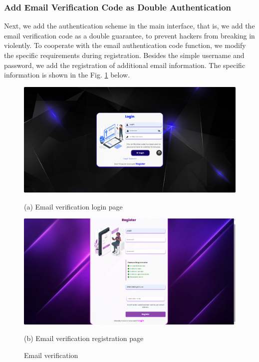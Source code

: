 \documentclass{article}
\begin{document}
\subsubsection{Add Email Verification Code as Double Authentication }
Next, we add the authentication scheme in the main interface, that is, we add the email verification code as a double guarantee, to prevent hackers from breaking in violently. 
To cooperate with the email authentication code function, we modify the specific requirements during registration. Besides the simple username and password, we add the registration of additional email information. 
The specific information is shown in the Fig. \ref{fig:email_verification} below.
\begin{figure}[htb]
    \begin{minipage}{0.5\textwidth}
        \centering
        \includegraphics[width=\textwidth]{images/email_authentication_login_screen.png}
        \caption*{(a) Email verification login page}
    \end{minipage}
    \hfill
    \begin{minipage}{0.5\textwidth}
        \centering
 \includegraphics[width=\textwidth]{images/email_authentication_register_screen.png}
        \caption*{(b) Email verification registration page}
    \end{minipage}
    \caption{Email verification}
    \label{fig:email_verification}
\end{figure}
\end{document}

